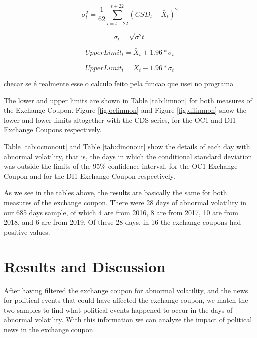 \documentclass[cic,tc, english]{iiufrgs}
\begin{document}
    $$\sigma^2_t = \frac{1}{62} \displaystyle\sum_{i=t-22}^{t+22} (CSD_t - \bar{X}_t)^2$$

    $$\sigma_t = \sqrt{\sigma^2t}$$

    \begin{equation}
        \label{eqn:upnp}
        UpperLimit_t = \bar{X}_t + 1.96 * \sigma_t
    \end{equation}

    \begin{equation}
        \label{eqn:lonp}
        UpperLimit_t = \bar{X}_t - 1.96 * \sigma_t
    \end{equation}

    {checar se é realmente esse o calculo feito pela funcao que usei no programa}

    The lower and upper limits are shown in Table \ref{tab:limnon} for both measures of the Exchange Coupon. Figure \ref{fig:oclimnon} and Figure \ref{fig:dilimnon} show the lower and lower limits altogether with the CDS series, for the OC1 and DI1 Exchange Coupons respectively.

    

    

    

    Table \ref{tab:ocnonout} and Table \ref{tab:dinonout} show the details of each day with abnormal volatility, that is, the days in which the conditional standard deviation was outside the limits of the 95\% confidence interval, for the OC1 Exchange Coupon and for the DI1 Exchange Coupon respectively.

    

    

    As we see in the tables above, the results are basically the same for both measures of the exchange coupon. There were 28 days of abnormal volatility in our 685 days sample, of which 4 are from 2016, 8 are from 2017, 10 are from 2018, and 6 are from 2019. Of these 28 days, in 16 the exchange coupons had positive values.

\section{Results and Discussion} \label{chapter_results_discussion}

    After having filtered the exchange coupon for abnormal volatility, and the news for political events that could have affected the exchange coupon, we match the two samples to find what political events happened to occur in the days of abnormal volatility. With this information we can analyze the impact of political news in the exchange coupon.
\end{document}
